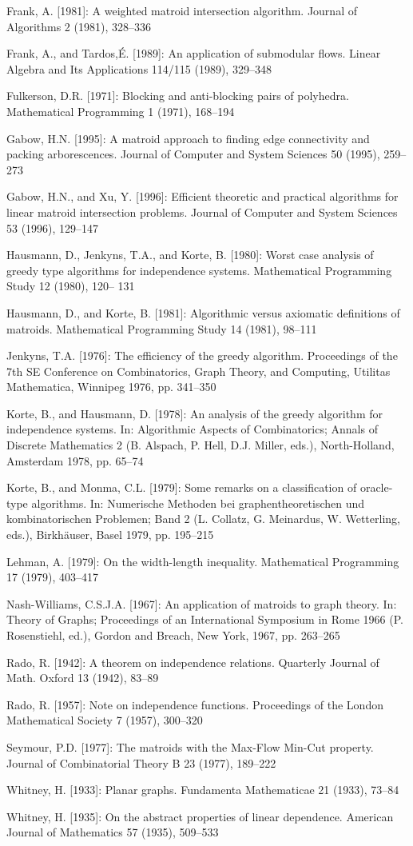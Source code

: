 {\small\setlength{\parindent}{0pt}\setlength{\parskip}{5pt}\sloppy
Frank, A. [1981]: A weighted matroid intersection algorithm. Journal of Algorithms 2 (1981), 328–336\par
Frank, A., and Tardos,É. [1989]: An application of submodular flows. Linear Algebra and Its Applications 114/115 (1989), 329–348\par
Fulkerson, D.R. [1971]: Blocking and anti-blocking pairs of polyhedra. Mathematical Programming 1 (1971), 168–194\par
Gabow, H.N. [1995]: A matroid approach to finding edge connectivity and packing arborescences. Journal of Computer and System Sciences 50 (1995), 259–273\par
Gabow, H.N., and Xu, Y. [1996]: Efficient theoretic and practical algorithms for linear matroid intersection problems. Journal of Computer and System Sciences 53 (1996), 129–147\par
Hausmann, D., Jenkyns, T.A., and Korte, B. [1980]: Worst case analysis of greedy type algorithms for independence systems. Mathematical Programming Study 12 (1980), 120– 131\par
Hausmann, D., and Korte, B. [1981]: Algorithmic versus axiomatic definitions of matroids. Mathematical Programming Study 14 (1981), 98–111\par
Jenkyns, T.A. [1976]: The efficiency of the greedy algorithm. Proceedings of the 7th SE Conference on Combinatorics, Graph Theory, and Computing, Utilitas Mathematica, Winnipeg 1976, pp. 341–350\par
Korte, B., and Hausmann, D. [1978]: An analysis of the greedy algorithm for independence systems. In: Algorithmic Aspects of Combinatorics; Annals of Discrete Mathematics 2 (B. Alspach, P. Hell, D.J. Miller, eds.), North-Holland, Amsterdam 1978, pp. 65–74\par
Korte, B., and Monma, C.L. [1979]: Some remarks on a classification of oracle-type algorithms. In: Numerische Methoden bei graphentheoretischen und kombinatorischen Problemen; Band 2 (L. Collatz, G. Meinardus, W. Wetterling, eds.), Birkhäuser, Basel 1979, pp. 195–215\par
Lehman, A. [1979]: On the width-length inequality. Mathematical Programming 17 (1979), 403–417\par
Nash-Williams, C.S.J.A. [1967]: An application of matroids to graph theory. In: Theory of Graphs; Proceedings of an International Symposium in Rome 1966 (P. Rosenstiehl, ed.), Gordon and Breach, New York, 1967, pp. 263–265\par
Rado, R. [1942]: A theorem on independence relations. Quarterly Journal of Math. Oxford 13 (1942), 83–89\par
Rado, R. [1957]: Note on independence functions. Proceedings of the London Mathematical Society 7 (1957), 300–320\par
Seymour, P.D. [1977]: The matroids with the Max-Flow Min-Cut property. Journal of Combinatorial Theory B 23 (1977), 189–222\par
Whitney, H. [1933]: Planar graphs. Fundamenta Mathematicae 21 (1933), 73–84\par
Whitney, H. [1935]: On the abstract properties of linear dependence. American Journal of Mathematics 57 (1935), 509–533\par
}
